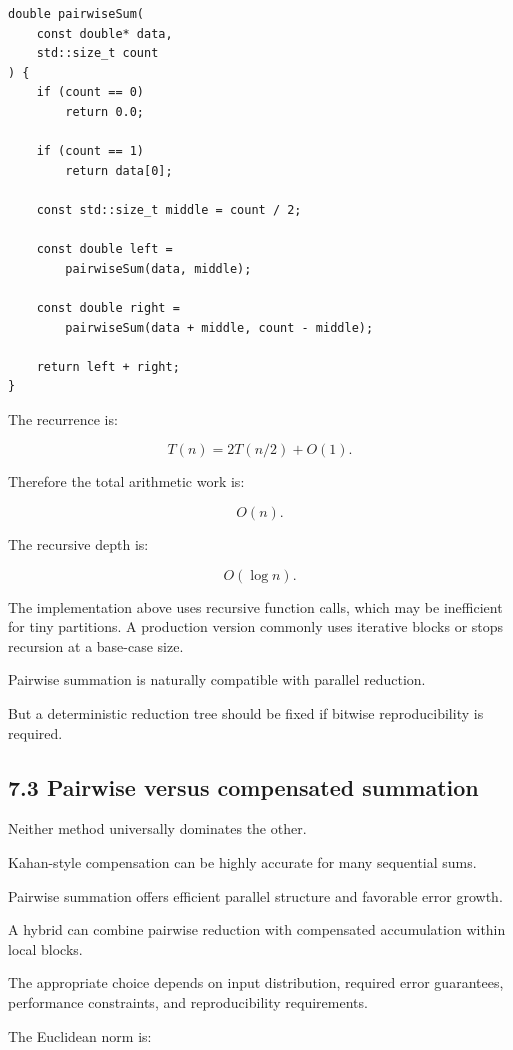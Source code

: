 \begin{verbatim}
double pairwiseSum(
    const double* data,
    std::size_t count
) {
    if (count == 0)
        return 0.0;

    if (count == 1)
        return data[0];

    const std::size_t middle = count / 2;

    const double left =
        pairwiseSum(data, middle);

    const double right =
        pairwiseSum(data + middle, count - middle);

    return left + right;
}
\end{verbatim}

The recurrence is:

\[ T(n)=2T(n/2)+O(1). \]

Therefore the total arithmetic work is:

\[ \boxed{O(n)}. \]

The recursive depth is:

\[ \boxed{O(\log n)}. \]

The implementation above uses recursive function calls, which may be inefficient for tiny partitions. A production version commonly uses iterative blocks or stops recursion at a base-case size.

Pairwise summation is naturally compatible with parallel reduction.

But a deterministic reduction tree should be fixed if bitwise reproducibility is required.

\subsection{7.3 Pairwise versus compensated summation}\label{02-foundations-ii-ch028-pairwise-versus-compensated-summation}

Neither method universally dominates the other.

Kahan-style compensation can be highly accurate for many sequential sums.

Pairwise summation offers efficient parallel structure and favorable error growth.

A hybrid can combine pairwise reduction with compensated accumulation within local blocks.

The appropriate choice depends on input distribution, required error guarantees, performance constraints, and reproducibility requirements.

The Euclidean norm is:

